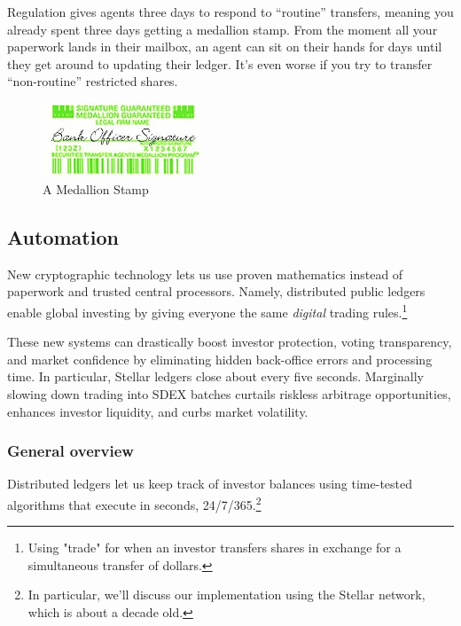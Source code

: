 \documentclass[11pt, english]{article}
\begin{document}
\begin{multicols}{2}
Regulation gives agents three days to respond to ``routine'' transfers, meaning you already spent three days getting a medallion stamp. From the moment all your paperwork lands in their mailbox, an agent can sit on their hands for days until they get around to updating their ledger. It's even worse if you try to transfer ``non-routine'' restricted shares. 

\begin{figure}[H]
    \centering
    \includegraphics[width=180]{medallion.jpg}
    \caption{A Medallion Stamp}
    \label{fig:decentralized}
\end{figure}


\subsection{Automation}

New cryptographic technology lets us use proven mathematics instead of paperwork and trusted central processors. Namely, distributed public ledgers enable global investing by giving everyone the same \textit{digital} trading rules.\footnote{Using "trade" for when an investor transfers shares in exchange for a simultaneous transfer of dollars.}

These new systems can drastically boost investor protection, voting transparency, and market confidence by eliminating hidden back-office errors and processing time. In particular, Stellar ledgers close about every five seconds. Marginally slowing down trading into SDEX batches curtails riskless arbitrage opportunities, enhances investor liquidity, and curbs market volatility. \cite{Veryzhenko_2017,Budish_2015,Chakrabarty_2015}

\subsubsection{General overview}

Distributed ledgers let us keep track of investor balances using time-tested algorithms that execute in seconds, 24/7/365.\footnote{In particular, we'll discuss our implementation using the Stellar network, which is about a decade old.}


\end{multicols}
\end{document}

